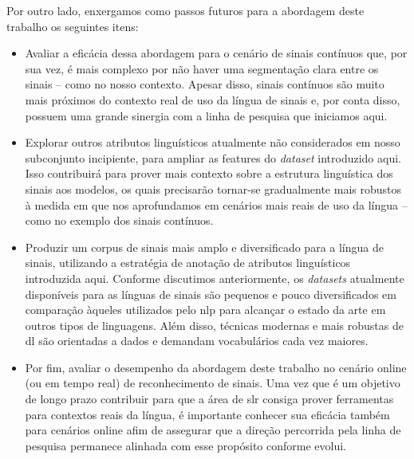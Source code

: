 Por outro lado, enxergamos como passos futuros para a abordagem deste trabalho os seguintes itens:

\begin{itemize}
    \item Avaliar a eficácia dessa abordagem para o cenário de sinais contínuos que, por sua vez, é mais complexo por não haver uma segmentação clara entre os sinais -- como no nosso contexto.
          Apesar disso, sinais contínuos são muito mais próximos do contexto real de uso da língua de sinais e, por conta disso, possuem uma grande sinergia com a linha de pesquisa que iniciamos aqui.

    \item Explorar outros atributos linguísticos atualmente não considerados em nosso subconjunto incipiente, para ampliar as features do \textit{dataset} introduzido aqui.
          Isso contribuirá para prover mais contexto sobre a estrutura linguística dos sinais aos modelos, os quais precisarão tornar-se gradualmente mais robustos à medida em que nos aprofundamos em cenários mais reais de uso da língua -- como no exemplo dos sinais contínuos.

    \item Produzir um corpus de sinais mais amplo e diversificado para a língua de sinais, utilizando a estratégia de anotação de atributos linguísticos introduzida aqui.
          Conforme discutimos anteriormente, os \textit{datasets} atualmente disponíveis para as línguas de sinais são pequenos e pouco diversificados em comparação àqueles utilizados pelo \acrfull{nlp} para alcançar o estado da arte em outros tipos de linguagens.
          Além disso, técnicas modernas e mais robustas de \acrlong{dl} são orientadas a dados e demandam vocabulários cada vez maiores.

    \item Por fim, avaliar o desempenho da abordagem deste trabalho no cenário online (ou em tempo real) de reconhecimento de sinais.
          Uma vez que é um objetivo de longo prazo contribuir para que a área de \acrshort{slr} consiga prover ferramentas para contextos reais da língua, é importante conhecer sua eficácia também para cenários online afim de assegurar que a direção percorrida pela linha de pesquisa permanece alinhada com esse propósito conforme evolui.
\end{itemize}



